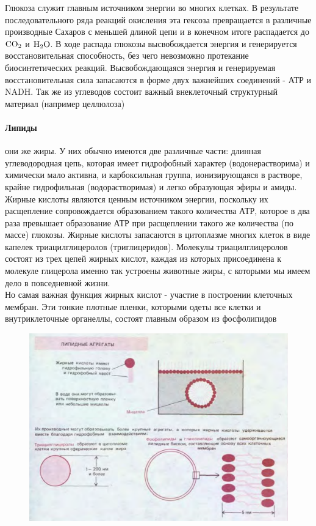 \documentclass[a4paper, 12pt]{article}
\begin{document}
Глюкоза служит главным источником энергии во многих клетках. В результате последовательного ряда реакций окисления эта гексоза превращается в различные производные Сахаров с меньшей длиной цепи и в конечном итоге распадается до $\ce{CO2}$ и $\ce{H2O}$. В ходе распада глюкозы высвобождается энергия и генерируется восстановительная способность, без чего невозможно протекание
биосинтетических реакций. Высвобождающаяся энергия и генерируемая восстановительная сила запасаются в форме двух важнейших соединений -
АТР и NADH. Так же из углеводов состоит важный внеклеточный структурный материал (например целлюлоза) 
	\paragraph{Липиды} они же жиры. У них обычно имеются две различные части: длинная углеводородная цепь,
	которая имеет гидрофобный характер (водонерастворима) и химически мало активна, и карбоксильная группа, ионизирующаяся в растворе, крайне
	гидрофильная (водорастворимая) и легко образующая эфиры и амиды.\\
	Жирные кислоты являются ценным источником энергии, поскольку их
	расщепление сопровождается образованием такого количества АТР, которое в два раза
	превышает образование АТР при расщеплении такого же количества (по массе)
	глюкозы. Жирные кислоты запасаются в цитоплазме многих клеток в виде капелек
	триацилглицеролов (триглицеридов). Молекулы триацилглицеролов состоят из трех
	цепей жирных кислот, каждая из которых присоединена к молекуле глицерола  именно так устроены животные жиры, с которыми мы имеем дело в
	повседневной жизни.\\
	Но самая важная функция жирных кислот - участие в построении клеточных
	мембран. Эти тонкие плотные пленки, которыми одеты все клетки и внутриклеточные
	органеллы, состоят главным образом из фосфолипидов
	\begin{figure}[H]
		\centering
		\includegraphics[scale=0.3]{2lipid}
	\end{figure}
\end{document}
